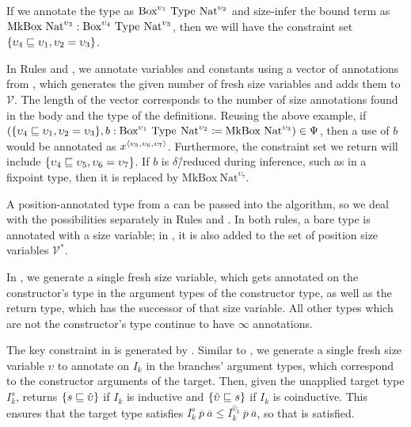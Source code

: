 If we annotate the type as $\text{Box}^{\upsilon_1} ~ \text{Type}_{} ~ \text{Nat}^{\upsilon_2}$ and size-infer the bound term as $\text{MkBox} ~ \text{Nat}^{\upsilon_3} : \text{Box}^{\upsilon_4} ~ \text{Type}_{} ~ \text{Nat}^{\upsilon_3}$, then we will have the constraint set $\{\upsilon_4 \sqsubseteq \upsilon_1, \upsilon_2 = \upsilon_3\}$.

In Rules  and , we annotate variables and constants using a vector of annotations from \fresh, which generates the given number of fresh size variables and adds them to $\mathcal{V}$.
The length of the vector corresponds to the number of size annotations found in the body and the type of the definitions.
Reusing the above example, if $(\{\upsilon_4 \sqsubseteq \upsilon_1, \upsilon_2 = \upsilon_3\}, b : \text{Box}^{\upsilon_1} ~ \text{Type}_{} ~ \text{Nat}^{\upsilon_2} \coloneqq \text{MkBox} ~ \text{Nat}^{\upsilon_3}) \in \Psi$, then a use of $b$ would be annotated as $x^{\langle\upsilon_5, \upsilon_6, \upsilon_7\rangle}$.
Furthermore, the constraint set we return will include $\{\upsilon_4 \sqsubseteq \upsilon_5, \upsilon_6 = \upsilon_7\}$.
If $b$ is $\delta$\=/reduced during inference, such as in a fixpoint type, then it is replaced by $\text{MkBox} ~ \text{Nat}^{\upsilon_7}$.

A position-annotated type from a \cofixpoint can be passed into the algorithm, so we deal with the possibilities separately in Rules  and .
In both rules, a bare \coinductive type is annotated with a size variable; in , it is also added to the set of position size variables $\mathcal{V}^*$.

In , we generate a single fresh size variable, which gets annotated on the constructor's \coinductive type in the argument types of the constructor type, as well as the return type, which has the successor of that size variable.
All other \coinductive types which are not the constructor's \coinductive type continue to have $\infty$ annotations.

The key constraint in  is generated by \casesize.
Similar to , we generate a single fresh size variable $\upsilon$ to annotate on $I_k$ in the branches' argument types, which correspond to the constructor arguments of the target.
Then, given the unapplied target type $I_k^s$, \casesize returns $\{s \sqsubseteq \hat{\upsilon}\}$ if $I_k$ is inductive and $\{\hat{\upsilon} \sqsubseteq s\}$ if $I_k$ is coinductive.
This ensures that the target type satisfies $I_k^s ~ \overline{p} ~ \overline{a} \leq I_k^{\hat{\upsilon}_k} ~ \overline{p} ~ \overline{a}$, so that  is satisfied.

